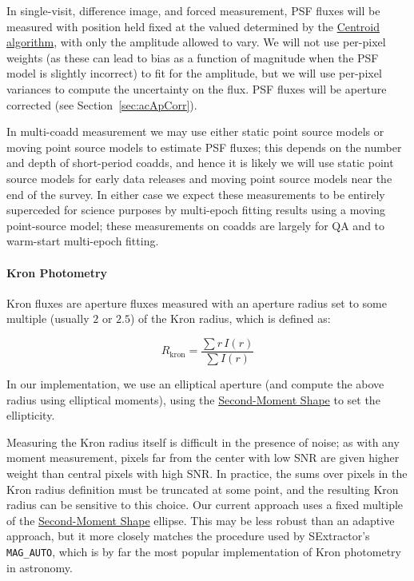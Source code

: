 In single-visit, difference image, and forced measurement, PSF fluxes will be measured with position held fixed at the valued determined by the \hyperref[ac:CentroidAlgorithms]{Centroid algorithm}, with only the amplitude allowed to vary.  We will not use per-pixel weights (as these can lead to bias as a function of magnitude when the PSF model is slightly incorrect) to fit for the amplitude, but we will use per-pixel variances to compute the uncertainty on the flux.  PSF fluxes will be aperture corrected (see Section~\ref{sec:acApCorr}).

In multi-coadd measurement we may use either static point source models or moving point source models to estimate PSF fluxes; this depends on the number and depth of short-period coadds, and hence it is likely we will use static point source models for early data releases and moving point source models near the end of the survey.  In either case we expect these measurements to be entirely superceded for science purposes by multi-epoch fitting results using a moving point-source model; these measurements on coadds are largely for QA and to warm-start multi-epoch fitting.

\paragraph{Kron Photometry}
\label{sec:acKronPhotometry}

Kron fluxes are aperture fluxes measured with an aperture radius set to some multiple (usually $2$ or $2.5$) of the Kron radius, which is defined as:

$$
R_{\mathrm{kron}} = \frac{\sum r \, I(r)}{\sum I(r)}
$$

In our implementation, we use an elliptical aperture (and compute the above radius using elliptical moments), using the \hyperref[sec:acShapeAlgorithms]{Second-Moment Shape} to set the ellipticity.

Measuring the Kron radius itself is difficult in the presence of noise; as with any moment measurement, pixels far from the center with low SNR are given higher weight than central pixels with high SNR.  In practice, the sums over pixels in the Kron radius definition must be truncated at some point, and the resulting Kron radius can be sensitive to this choice.  Our current approach uses a fixed multiple of the \hyperref[sec:acShapeAlgorithms]{Second-Moment Shape} ellipse.  This may be less robust than an adaptive approach, but it more closely matches the procedure used by SExtractor's \texttt{MAG\_AUTO}, which is by far the most popular implementation of Kron photometry in astronomy.


